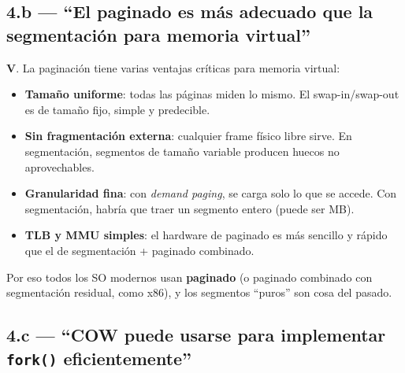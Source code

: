 \documentclass[11pt,a4paper]{article}
\begin{document}
\subsection*{4.b --- ``El paginado es más adecuado que la segmentación para memoria virtual''}

\begin{respuesta}
\textbf{V}. La paginación tiene varias ventajas críticas para
memoria virtual:

\begin{itemize}[leftmargin=*,nosep]
    \item \textbf{Tamaño uniforme}: todas las páginas miden lo
        mismo. El swap-in/swap-out es de tamaño fijo, simple y
        predecible.
    \item \textbf{Sin fragmentación externa}: cualquier frame
        físico libre sirve. En segmentación, segmentos de tamaño
        variable producen huecos no aprovechables.
    \item \textbf{Granularidad fina}: con \emph{demand paging}, se
        carga solo lo que se accede. Con segmentación, habría que
        traer un segmento entero (puede ser MB).
    \item \textbf{TLB y MMU simples}: el hardware de paginado es
        más sencillo y rápido que el de segmentación + paginado
        combinado.
\end{itemize}

Por eso todos los SO modernos usan \textbf{paginado} (o paginado
combinado con segmentación residual, como x86), y los segmentos
``puros'' son cosa del pasado.
\end{respuesta}

\subsection*{4.c --- ``COW puede usarse para implementar \texttt{fork()} eficientemente''}
\end{document}
